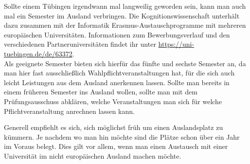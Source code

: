 Sollte einem Tübingen irgendwann mal langweilig geworden sein, kann man auch mal ein Semester im Ausland verbringen. Die Kognitionswissenschaft unterhält dazu zusammen mit der Informatik Erasmus-Austauschprogramme mit mehreren europäischen Universitäten. Informationen zum Bewerbungsverlauf und den verschiedenen Partneruniversitäten findet ihr unter \url{https://uni-tuebingen.de/de/63372}.\\

Als geeignete Semester bieten sich hierfür das fünfte und sechste Semester an, da man hier fast ausschließlich Wahlpflichtveranstaltungen hat, für die sich auch leicht Leistungen aus dem Ausland anerkennen lassen. Sollte man bereits in einem früheren Semester ins Ausland wollen, sollte man mit dem Prüfungsausschuss abklären, welche Veranstaltungen man sich für welche Pflichtveranstaltung anrechnen lassen kann.

Generell empfiehlt es sich, sich möglichst früh um einen Auslandsplatz zu kümmern. Je nachdem wo man hin möchte sind die Plätze schon über ein Jahr im Voraus belegt. Dies gilt vor allem, wenn man einen Austausch mit einer Universität im nicht europäischen Ausland machen möchte.
